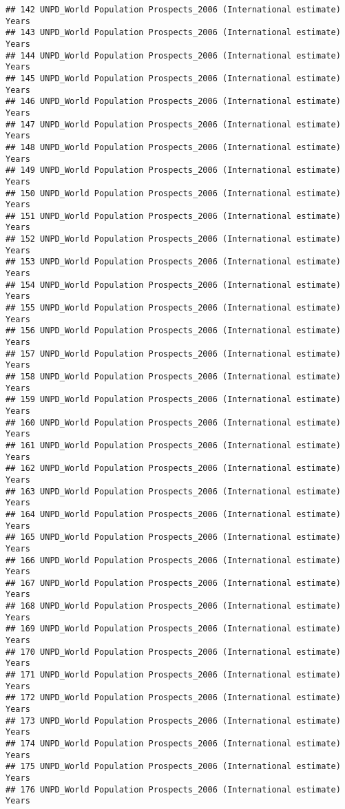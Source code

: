 \documentclass[]{article}
\begin{document}
\begin{verbatim}
## 142 UNPD_World Population Prospects_2006 (International estimate) Years
## 143 UNPD_World Population Prospects_2006 (International estimate) Years
## 144 UNPD_World Population Prospects_2006 (International estimate) Years
## 145 UNPD_World Population Prospects_2006 (International estimate) Years
## 146 UNPD_World Population Prospects_2006 (International estimate) Years
## 147 UNPD_World Population Prospects_2006 (International estimate) Years
## 148 UNPD_World Population Prospects_2006 (International estimate) Years
## 149 UNPD_World Population Prospects_2006 (International estimate) Years
## 150 UNPD_World Population Prospects_2006 (International estimate) Years
## 151 UNPD_World Population Prospects_2006 (International estimate) Years
## 152 UNPD_World Population Prospects_2006 (International estimate) Years
## 153 UNPD_World Population Prospects_2006 (International estimate) Years
## 154 UNPD_World Population Prospects_2006 (International estimate) Years
## 155 UNPD_World Population Prospects_2006 (International estimate) Years
## 156 UNPD_World Population Prospects_2006 (International estimate) Years
## 157 UNPD_World Population Prospects_2006 (International estimate) Years
## 158 UNPD_World Population Prospects_2006 (International estimate) Years
## 159 UNPD_World Population Prospects_2006 (International estimate) Years
## 160 UNPD_World Population Prospects_2006 (International estimate) Years
## 161 UNPD_World Population Prospects_2006 (International estimate) Years
## 162 UNPD_World Population Prospects_2006 (International estimate) Years
## 163 UNPD_World Population Prospects_2006 (International estimate) Years
## 164 UNPD_World Population Prospects_2006 (International estimate) Years
## 165 UNPD_World Population Prospects_2006 (International estimate) Years
## 166 UNPD_World Population Prospects_2006 (International estimate) Years
## 167 UNPD_World Population Prospects_2006 (International estimate) Years
## 168 UNPD_World Population Prospects_2006 (International estimate) Years
## 169 UNPD_World Population Prospects_2006 (International estimate) Years
## 170 UNPD_World Population Prospects_2006 (International estimate) Years
## 171 UNPD_World Population Prospects_2006 (International estimate) Years
## 172 UNPD_World Population Prospects_2006 (International estimate) Years
## 173 UNPD_World Population Prospects_2006 (International estimate) Years
## 174 UNPD_World Population Prospects_2006 (International estimate) Years
## 175 UNPD_World Population Prospects_2006 (International estimate) Years
## 176 UNPD_World Population Prospects_2006 (International estimate) Years

\end{verbatim}
\end{document}
